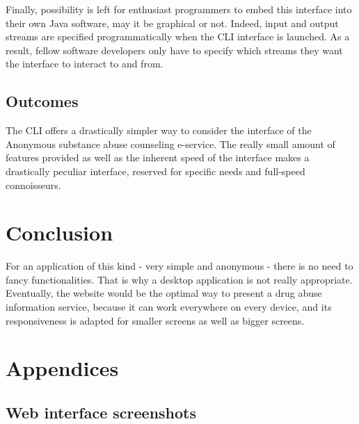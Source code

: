 \documentclass[a4paper,12pt, twocolumn]{article}
\begin{document}
Finally, possibility is left for enthusiast programmers to embed this interface into their own Java software, may it be graphical or not. Indeed, input and output streams are specified programmatically when the CLI interface is launched. As a result, fellow software developers only have to specify which streams they want the interface to interact to and from.

\subsection*{Outcomes}
The CLI offers a drastically simpler way to consider the interface of the Anonymous substance abuse counseling e-service. The really small amount of features provided as well as the inherent speed of the interface makes a drastically peculiar interface, reserved for specific needs and full-speed connoisseurs.\\

\section*{Conclusion}
For an application of this kind - very simple and anonymous - there is no need to fancy functionalities. That is why a desktop application is not really appropriate. Eventually, the website would be the optimal way to  present a drug abuse information service, because it can work everywhere on every device, and its responsiveness is adapted for smaller screens as well as bigger screens.


\clearpage
\newpage

\section*{Appendices}

\appendix
\renewcommand{\thesubsection}{\thesection \Alph{subsection}}


\subsection{Web interface screenshots}
\end{document}
